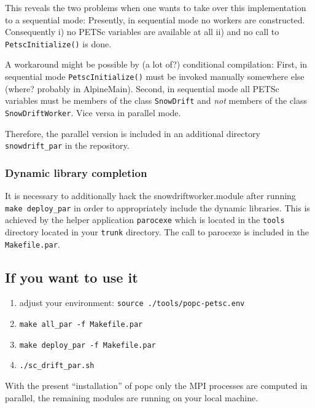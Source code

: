 \documentclass[12pt]{report}
\begin{document}
This reveals the two problems when one wants to take over this
implementation to a sequential mode: Presently, in sequential mode no
workers are constructed. Consequently i) no PETSc variables are
available at all ii) and no call to \verb+PetscInitialize()+ is done.

A workaround might be possible by (a lot of?) conditional compilation:
First, in sequential mode \verb+PetscInitialize()+ must be invoked
manually somewhere else (where? probably in AlpineMain). Second, in
sequential mode all PETSc variables must be members of the class
\verb+SnowDrift+ and {\em not} members of the class
\verb+SnowDriftWorker+. Vice versa in parallel mode.

Therefore, the parallel version is included in an additional directory
\verb+snowdrift_par+ in the repository.


\subsubsection{Dynamic library completion}
It is necessary to additionally hack the snowdriftworker.module after
running \verb+make deploy_par+ in order to appropriately include the
dynamic libraries. This is achieved by the helper application
\verb+parocexe+ which is located in the \verb+tools+ directory located
in your \verb+trunk+ directory. The call to parocexe is included in
the \verb+Makefile.par+.


\subsection{If you want to use it}
\begin{enumerate}
\item adjust your environment:
  \verb+source ./tools/popc-petsc.env+
\item \verb+make all_par -f Makefile.par+ 
\item \verb+make deploy_par -f Makefile.par+
\item \verb+./sc_drift_par.sh+
\end{enumerate}

With the present ``installation'' of popc only the MPI processes are
computed in parallel, the remaining modules are running on your local
machine.
\end{document}
